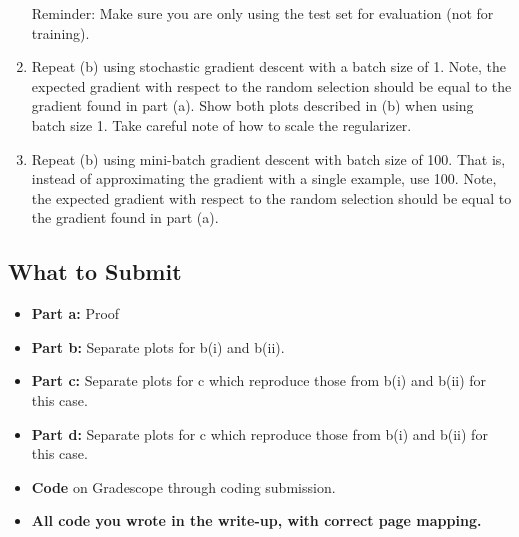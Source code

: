 \documentclass{article}
\begin{document}
\begin{aprob}
\begin{enumerate}
        Reminder: Make sure you are only using the test set for evaluation (not for training).
          
        \item {} Repeat (b) using stochastic gradient descent with a batch size of 1. Note, the expected gradient with respect to the random selection should be equal to the gradient found in part (a). Show both plots described in (b) when using batch size 1. Take careful note of how to scale the regularizer.
        \item {} Repeat (b) using mini-batch gradient descent with batch size of 100. That is, instead of approximating the gradient with a single example, use 100. Note, the expected gradient with respect to the random selection should be equal to the gradient found in part (a).
    \end{enumerate}
    
    \subsection*{What to Submit}
    \begin{itemize}
        \item \textbf{Part a:} Proof
        \item \textbf{Part b:} Separate plots for b(i) and b(ii).
        \item \textbf{Part c:} Separate plots for c which reproduce those from b(i) and b(ii) for this case.
        \item \textbf{Part d:} Separate plots for c which reproduce those from b(i) and b(ii) for this case.
        \item \textbf{Code} on Gradescope through coding submission.
        \item \textbf{All code you wrote in the write-up, with correct page mapping.}
    \end{itemize}
\end{aprob}

\newpage
\end{document}
